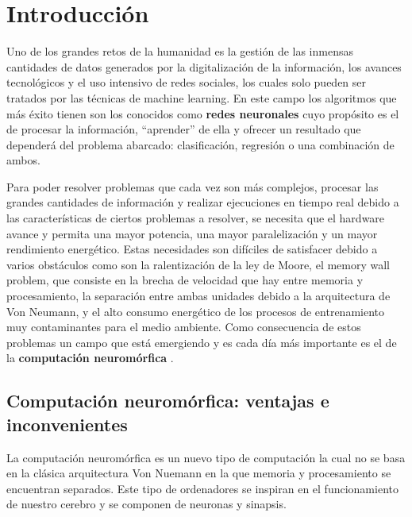 \chapter{Introducción}
Uno de los grandes retos de la humanidad es la gestión de las inmensas cantidades de datos generados por la digitalización de la información, los avances tecnológicos y el uso intensivo de redes sociales, los cuales solo pueden ser tratados por las técnicas de machine learning. En este campo los algoritmos que más éxito tienen son los conocidos como \textbf{redes neuronales} cuyo propósito es el de procesar la información, ``aprender'' de ella y ofrecer un resultado que dependerá del problema abarcado: clasificación, regresión o una combinación de ambos. 

Para poder resolver problemas que cada vez son más complejos, procesar las grandes cantidades de información y realizar ejecuciones en tiempo real debido a las características de ciertos problemas a resolver, se necesita que el hardware avance y permita una mayor potencia, una mayor paralelización y un mayor rendimiento energético. Estas necesidades son difíciles de satisfacer debido a varios obstáculos como son la ralentización de la ley de Moore, el memory wall problem, que consiste en la brecha de velocidad que hay entre memoria y procesamiento, la separación entre ambas unidades debido a la arquitectura de Von Neumann, y el alto consumo energético de los procesos de entrenamiento muy contaminantes para el medio ambiente. Como consecuencia de estos problemas un campo que está emergiendo y es cada día más importante es el de la \textbf{computación neuromórfica} \cite{RefWorks:RefID:4-schuman2022opportunities}. 

\section{Computación neuromórfica: ventajas e inconvenientes}
La computación neuromórfica es un nuevo tipo de computación la cual no se basa en la clásica arquitectura Von Nuemann en la que memoria y procesamiento se encuentran separados. Este tipo de ordenadores se inspiran en el funcionamiento de nuestro cerebro y se componen de neuronas y sinapsis. 

